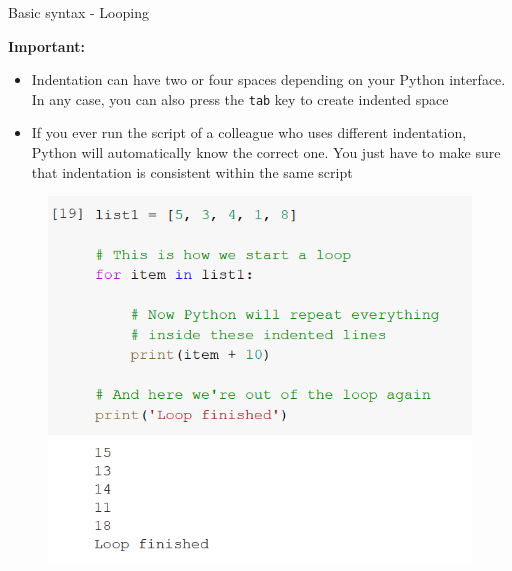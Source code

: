 \documentclass[aspectratio=169]{beamer}
\begin{document}
\begin{frame}{Basic syntax - Looping}

	\textbf{Important:}

	\begin{multicols}{2}
	
		\begin{itemize}
			\item Indentation can have two or four spaces depending on your Python interface. In any case, you can also press the \texttt{tab} key to create indented space
			\item If you ever run the script of a colleague who uses different indentation, Python will automatically know the correct one. You just have to make sure that indentation is consistent within the same script
		\end{itemize}
		\begin{figure}
			\centering
			\includegraphics[width=\linewidth]{img/list_loop.png}
		\end{figure}

	\end{multicols}

\end{frame}
\end{document}
